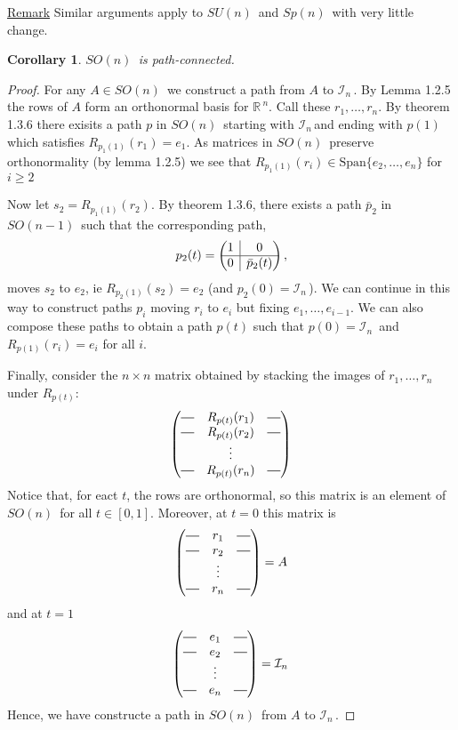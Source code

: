 \documentclass[12pt,a4paper]{article}
\newcommand{\rR}{\ensuremath{\mathbb{R}\,}}
\newcommand{\gspk}[1]{\ensuremath{Sp(#1)\,}}
\newcommand{\gsok}[1]{\ensuremath{SO(#1)\,}}
\newcommand{\gsuk}[1]{\ensuremath{SU(#1)\,}}
\newcommand{\cin}{\ensuremath{\mathcal{I}_n\,}}
\newcommand{\ul}[1]{\underline{#1}}
\newcommand*{\horzbar}{\rule[.5ex]{2.5ex}{0.5pt}}
\newtheorem{cor}[thm]{Corollary}
\newcommand{\rvline}{\hspace*{-\arraycolsep}\vline\hspace*{-\arraycolsep}}
\begin{document}
\ul{Remark} Similar arguments apply to \gsuk{n} and \gspk{n} with very little change.

\begin{cor}
\gsok{n} is path-connected.
\end{cor}

\begin{proof}
For any $A \in \gsok{n}$ we construct a path from $A$ to \cin. By Lemma 1.2.5 the rows of $A$ form an orthonormal basis for $\rR^n$. Call these $r_1, \hdots , r_n$. By theorem 1.3.6 there exisits a path $p$ in \gsok{n} starting with \cin and ending with $p(1)$ which satisfies $R_{p_1(1)}(r_1) = e_1$. As matrices in \gsok{n} preserve orthonormality (by lemma 1.2.5) we see that $R_{p_1(1)}(r_i) \in \mbox{Span}\{e_2, \hdots , e_n\}$ for $i \geq 2$

Now let $s_2 = R_{p_1(1)}(r_2)$. By theorem 1.3.6, there exists a path $\bar{p}_2$ in \gsok{n-1} such that the corresponding path,
\[
p_2(t) =
\begin{pmatrix}
  1 & \rvline & 0
  \\
\hline

  0 & \rvline & \bar{p}_2(t)
\end{pmatrix},
\]
moves $s_2$ to $e_2$, ie $R_{p_2(1)}(s_2) = e_2$ (and $p_2(0) = \cin$). We can continue in this way to construct paths $p_i$ moving $r_i$ to $e_i$ but fixing $e_1, \hdots , e_{i-1}$. We can also compose these paths to obtain a path $p(t)$ such that $p(0) = \cin$ and $R_{p(1)}(r_i) = e_i$ for all $i$.

Finally, consider the $n\times n$ matrix obtained by stacking the images of $r_1, \hdots , r_n$ under $R_{p(t)}$:
\[
\begin{pmatrix}
  \horzbar & R_{p(t)}(r_1) & \horzbar \\
  \horzbar & R_{p(t)}(r_2) & \horzbar \\
  & \vdots &        \\
  \horzbar & R_{p(t)}(r_n) & \horzbar
\end{pmatrix}
\]
Notice that, for eact $t$, the rows are orthonormal, so this matrix is an element of \gsok{n} for all $t \in [0, 1]$. Moreover, at $t=0$ this matrix is
\[
\begin{pmatrix}
  \horzbar & r_1 & \horzbar \\
  \horzbar & r_2 & \horzbar \\
  & \vdots &        \\
  \horzbar & r_n & \horzbar
\end{pmatrix}
= A
\]
and at $t=1$
\[
\begin{pmatrix}
  \horzbar & e_1 & \horzbar \\
  \horzbar & e_2 & \horzbar \\
  & \vdots & \\
  \horzbar & e_n & \horzbar \\
\end{pmatrix}
= \cin
\]
Hence, we have constructe a path in \gsok{n} from $A$ to \cin.
\end{proof}
\end{document}
